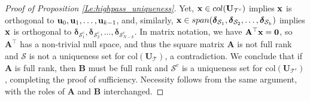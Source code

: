 \documentclass[journal, 10pt]{IEEEtran}
\begin{document}
{\begin{proof}[Proof of Proposition \ref{Le:highpass_uniqueness}]
Yet, ${\bf x} \in \mbox{col}({\mathbf{U}}_{{\mathcal T}^c})$ implies ${\bf x}$ is orthogonal to  ${\bf u}_0, {\bf u}_1, \ldots, {\bf u}_{k-1}$, and, similarly, 
${\bf x} \in \mbox{span}({\boldsymbol \delta}_{\mathcal{S}_{1}}, {\boldsymbol \delta}_{\mathcal{S}_{2}}, \ldots, {\boldsymbol \delta}_{\mathcal{S}_{k}})$ implies ${\bf x}$ is orthogonal to ${\boldsymbol \delta}_{\mathcal{S}^c_{1}}, {\boldsymbol \delta}_{\mathcal{S}^c_{2}}, \ldots, {\boldsymbol \delta}_{\mathcal{S}^c_{N-k}}.$
In matrix notation, we have $\mathbf{A}^{\top}{\bf x}={\bf 0}$, so $\mathbf{A}^{\top}$ has a non-trivial null space, and thus the square matrix $\mathbf{A}$ is not full rank and $\mathcal{S}$ is not a uniqueness set for $\mbox{col}({\mathbf{U}}_{\mathcal T})$, a contradiction. We conclude that if $\mathbf{A}$ is full rank, then $\mathbf{B}$ must be full rank and $\mathcal{S}^c$ is a uniqueness set for $\mbox{col}({\mathbf{U}}_{{\mathcal T}^c})$, completing the proof of sufficiency. Necessity follows from the same argument, with the roles of $\mathbf{A}$ and $\mathbf{B}$ interchanged.
\end{proof}
}


\balance

{\small }
\end{document}
